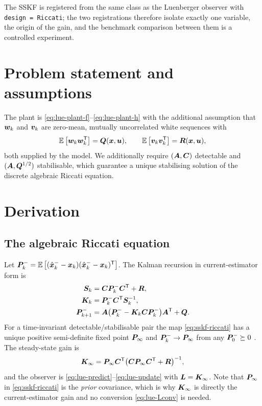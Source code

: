 The SSKF is registered from the same class as the Luenberger observer with
\texttt{design = Riccati}; the two registrations therefore isolate exactly one variable, the
origin of the gain, and the benchmark comparison between them is a controlled experiment.

\section{Problem statement and assumptions}
The plant is \eqref{eq:lue-plant-f}--\eqref{eq:lue-plant-h} with the additional assumption that
$\bm{w}_k$ and $\bm{v}_k$ are zero-mean, mutually uncorrelated white sequences with
\begin{equation}
\mathbb{E}\left[\bm{w}_k\bm{w}_k^{\mathsf{T}}\right] = \bm{Q}(\bm{x},\bm{u}), \qquad \mathbb{E}\left[\bm{v}_k\bm{v}_k^{\mathsf{T}}\right] = \bm{R}(\bm{x},\bm{u}) ,
\label{eq:sskf-noise}
\end{equation}
both supplied by the model.  We additionally require $(\bm{A},\bm{C})$ detectable and
$(\bm{A},\bm{Q}^{1/2})$ stabilisable, which guarantee a unique stabilising solution of the discrete
algebraic Riccati equation.

\section{Derivation}

\subsection{The algebraic Riccati equation}
Let $\bm{P}^{-}_k = \mathbb{E}\left[(\hat{\bm{x}}^{-}_k-\bm{x}_k)(\hat{\bm{x}}^{-}_k-\bm{x}_k)^{\mathsf{T}}\right]$.  The Kalman recursion in
current-estimator form is
\begin{align}
\bm{S}_k &= \bm{C}\bm{P}^{-}_k\bm{C}^{\mathsf{T}} + \bm{R} , \label{eq:sskf-S}\\
\bm{K}_k &= \bm{P}^{-}_k\bm{C}^{\mathsf{T}}\bm{S}_k^{-1} , \label{eq:sskf-K}\\
\bm{P}^{-}_{k+1} &= \bm{A}\big(\bm{P}^{-}_k - \bm{K}_k\bm{C}\bm{P}^{-}_k\big)\bm{A}^{\mathsf{T}} + \bm{Q} . \label{eq:sskf-riccati}
\end{align}
For a time-invariant detectable/stabilisable pair the map \eqref{eq:sskf-riccati} has a unique
positive semi-definite fixed point $\bm{P}_\infty$ and $\bm{P}^{-}_k\to\bm{P}_\infty$ from any
$\bm{P}^{-}_0\succeq 0$ \cite[Thm.~4.1]{andersonmoore1979}.  The steady-state gain is
\begin{equation}
\bm{K}_\infty = \bm{P}_\infty\bm{C}^{\mathsf{T}}\big(\bm{C}\bm{P}_\infty\bm{C}^{\mathsf{T}}+\bm{R}\big)^{-1} ,
\label{eq:sskf-Kinf}
\end{equation}
and the observer is \eqref{eq:lue-predict}--\eqref{eq:lue-update} with $\bm{L} = \bm{K}_\infty$.  Note
that $\bm{P}_\infty$ in \eqref{eq:sskf-riccati} is the \emph{prior} covariance, which is why
$\bm{K}_\infty$ is directly the current-estimator gain and no conversion \eqref{eq:lue-Lconv} is
needed.

